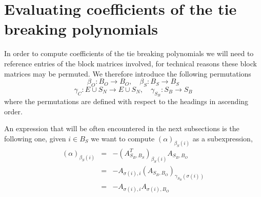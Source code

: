 \documentclass[a4paper]{article}
\begin{document}
\section{Evaluating coefficients of the tie breaking polynomials}
In order to compute coefficients of the tie breaking polynomials we will need to
reference entries of the block matrices involved, for technical reasons these
block matrices may be permuted. We therefore introduce the following
permutations
\begin{equation}
\beta_{O}: B_{O}  \rightarrow  B_{O}, \quad
\beta_{S}: B_{S} \rightarrow  B_{S}
\end{equation}
\begin{equation}
\gamma_{C}: E \cup S_{N} \rightarrow  E \cup S_{N}, \quad
\gamma_{S_{B}}: S_{B} \rightarrow  S_{B} 
\end{equation}
where the permutations are defined with respect to the headings in ascending
order.

An expression that will be often encountered in the next subsections is the
following one, given $i \in B_{S}$ we want to compute
$(\alpha)_{\beta_{S}(i)}$ as a subexpression,
\begin{eqnarray}
\left(\alpha\right)_{\beta_{S}(i)}
&=&
-\left(A_{S_{B}, B_{S}}^{T}\right)_{\beta_{S}(i)}A_{S_{B}, B_{O}}
\nonumber \\
&=&
-A_{\sigma(i), i}\left(A_{S_{B}, B_{O}}\right)_{\gamma_{S_{B}}(\sigma(i))}
\nonumber \\
&=&
\label{eq:alpha_beta_S}
-A_{\sigma(i), i}A_{\sigma(i), B_{O}}
\end{eqnarray}
\end{document}
